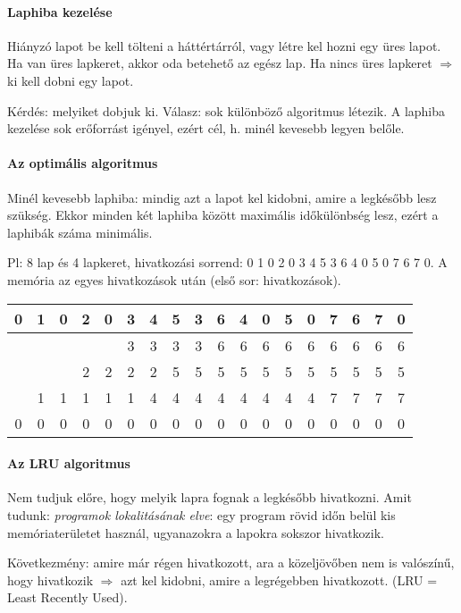 \documentclass[fleqn,10pt,a4paper]{article}
\newcommand{\nn}{\Rightarrow}
\theoremstyle{magyar}
\begin{document}
  \paragraph{Laphiba kezelése} Hiányzó lapot be kell tölteni a háttértárról, vagy létre kel hozni egy üres lapot. Ha van
  üres lapkeret, akkor oda betehető az egész lap. Ha nincs üres lapkeret $\nn$ ki kell dobni egy lapot. 

  Kérdés: melyiket dobjuk ki. Válasz: sok különböző algoritmus létezik. A laphiba kezelése sok erőforrást igényel, ezért
  cél, h. minél kevesebb legyen belőle.


  \paragraph{Az optimális algoritmus} Minél kevesebb laphiba: mindig azt a lapot kel kidobni, amire a legkésőbb lesz
  szükség. Ekkor minden két laphiba között maximális időkülönbség lesz, ezért a laphibák száma minimális.

  Pl: 8 lap és 4 lapkeret, hivatkozási sorrend: 0 1 0 2 0 3 4 5 3 6 4 0 5 0 7 6 7 0. A memória az egyes hivatkozások
  után (első sor: hivatkozások).\\
  
  \begin{tabular}{@{}cccccccccccccccccc@{}}\toprule
    0 & 1 & 0 & 2 & 0 & 3 & 4 & 5 & 3 & 6 & 4 & 0 & 5 & 0 & 7 & 6 & 7 & 0\\\midrule
    &   &   &   &   & 3 & 3 & 3 & 3 & 6 & 6 & 6 & 6 & 6 & 6 & 6 & 6 & 6\\
    &   &   & 2 & 2 & 2 & 2 & 5 & 5 & 5 & 5 & 5 & 5 & 5 & 5 & 5 & 5 & 5\\
    & 1 & 1 & 1 & 1 & 1 & 4 & 4 & 4 & 4 & 4 & 4 & 4 & 4 & 7 & 7 & 7 & 7\\
    0 & 0 & 0 & 0 & 0 & 0 & 0 & 0 & 0 & 0 & 0 & 0 & 0 & 0 & 0 & 0 & 0 & 0\\\bottomrule
  \end{tabular}


  
  \paragraph{Az LRU algoritmus} Nem tudjuk előre, hogy melyik lapra fognak a legkésőbb hivatkozni. Amit tudunk:
  \emph{programok lokalitásának elve}: egy program rövid időn belül kis memóriaterületet használ, ugyanazokra a
  lapokra sokszor hivatkozik.
  
  Következmény: amire már régen hivatkozott, ara a közeljövőben nem is valószínű, hogy hivatkozik $\nn$ azt kel kidobni,
  amire a legrégebben hivatkozott. (LRU = Least Recently Used).
\end{document}
